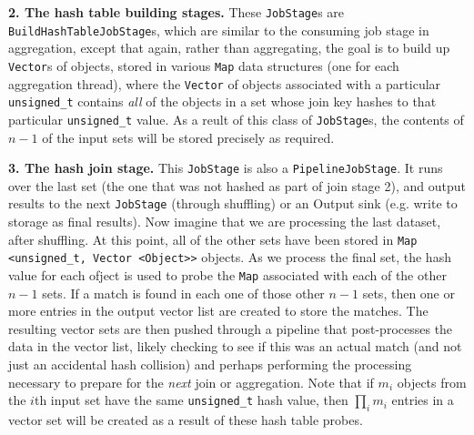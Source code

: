 \vspace{5pt}
{\bf 2. The hash table building stages.} These \texttt{JobStage}s are
\texttt{BuildHashTableJobStage}s, which are similar to the consuming job stage in aggregation, 
except that again, rather than aggregating, the goal is to build up \texttt{Vector}s of objects, stored in various \texttt{Map} data structures (one for each
aggregation thread), where the \texttt{Vector} of objects associated with a particular 
\texttt{unsigned\_t} contains \emph{all} of the objects in a set whose join key hashes to that particular \texttt{unsigned\_t} value.
As a reult of this class of \texttt{JobStage}s, the contents of $n - 1$ of the input sets will be stored precisely as required.

\vspace{5pt}
{\bf 3. The hash join stage.} 
This \texttt{JobStage} is also a \texttt{PipelineJobStage}. It runs over the last set (the one that was not 
hashed as part of join stage 2), and output results to the next
\texttt{JobStage} (through shuffling) or an Output sink (e.g. write to storage
as final results). Now imagine that we are processing the last dataset, after shuffling.  At this point,
all of the other sets have been
stored in \texttt{Map <unsigned\_t, Vector <Object}\texttt{>}\texttt{>} objects.  As we process the final set,
the hash value for each ofject is used to probe the \texttt{Map}
associated with each of the other $n-1$ sets.  If a match is found in each one of those other $n-1$ sets, then
one or more entries in the output vector list are created to store the matches.  The resulting vector sets are then pushed through a pipeline that post-processes
the data in the vector list, likely checking to see if this was an actual match (and not just an accidental hash collision) and perhaps performing the processing
necessary to prepare for the \emph{next} join or aggregation.
Note that if $m_i$ objects from the $i$th input set have the same \texttt{unsigned\_t} hash value, then $\prod_i m_i$ entries in a vector set will be created
as a result of these hash table probes. 

